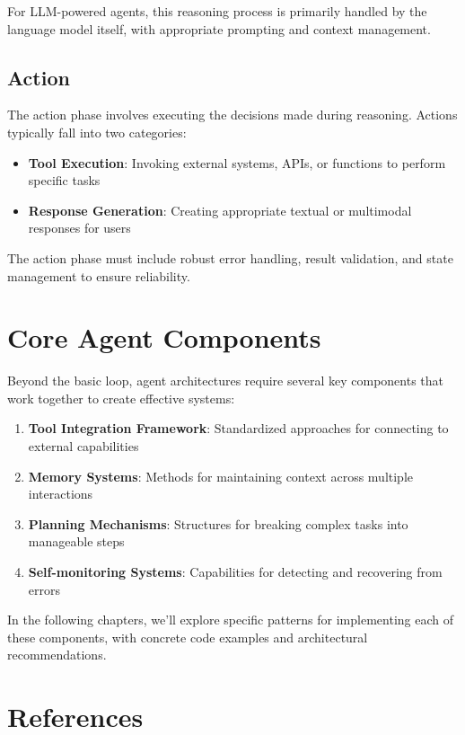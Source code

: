 \documentclass[11pt,oneside]{book}
\providecommand{\tightlist}{%
  \setlength{\itemsep}{0pt}\setlength{\parskip}{0pt}}
\begin{document}
For LLM-powered agents, this reasoning process is primarily handled by
the language model itself, with appropriate prompting and context
management.

\subsection{Action}\label{action}

The action phase involves executing the decisions made during reasoning.
Actions typically fall into two categories:

\begin{itemize}
\tightlist
\item
  \textbf{Tool Execution}: Invoking external systems, APIs, or functions
  to perform specific tasks
\item
  \textbf{Response Generation}: Creating appropriate textual or
  multimodal responses for users
\end{itemize}

The action phase must include robust error handling, result validation,
and state management to ensure reliability.

\section{Core Agent Components}\label{core-agent-components}

Beyond the basic loop, agent architectures require several key
components that work together to create effective systems:

\begin{enumerate}
\def\labelenumi{\arabic{enumi}.}
\tightlist
\item
  \textbf{Tool Integration Framework}: Standardized approaches for
  connecting to external capabilities
\item
  \textbf{Memory Systems}: Methods for maintaining context across
  multiple interactions
\item
  \textbf{Planning Mechanisms}: Structures for breaking complex tasks
  into manageable steps
\item
  \textbf{Self-monitoring Systems}: Capabilities for detecting and
  recovering from errors
\end{enumerate}

In the following chapters, we'll explore specific patterns for
implementing each of these components, with concrete code examples and
architectural recommendations.

\section{References}\label{references}
\end{document}
